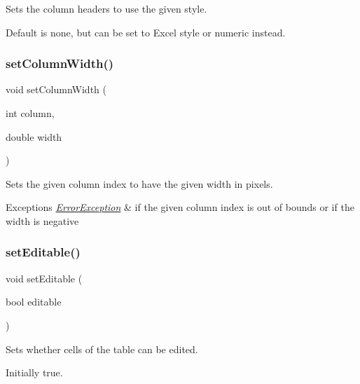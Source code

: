 Sets the column headers to use the given style. 

Default is none, but can be set to Excel style or numeric instead. \mbox{\label{classGTable_a52075dc231c73a896bcef426047fd327}} 
\subsubsection{\texorpdfstring{set\+Column\+Width()}{setColumnWidth()}}
{\footnotesize\ttfamily void set\+Column\+Width (\begin{DoxyParamCaption}\item[{int}]{column,  }\item[{double}]{width }\end{DoxyParamCaption})\hspace{0.3cm}{\ttfamily [virtual]}}



Sets the given column index to have the given width in pixels. 


\begin{DoxyExceptions}{Exceptions}
{\em \mbox{\hyperlink{classErrorException}{Error\+Exception}}} & if the given column index is out of bounds or if the width is negative \\
\hline
\end{DoxyExceptions}
\mbox{\label{classGTable_a52455aaff9ee352ca405fa61ba246b84}} 
\subsubsection{\texorpdfstring{set\+Editable()}{setEditable()}}
{\footnotesize\ttfamily void set\+Editable (\begin{DoxyParamCaption}\item[{bool}]{editable }\end{DoxyParamCaption})\hspace{0.3cm}{\ttfamily [virtual]}}



Sets whether cells of the table can be edited. 

Initially true. \mbox{\label{classGTable_aaefc85e4ff762ca176a90ebac163f2c0}} 

